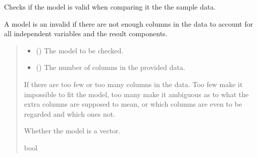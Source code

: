 \documentclass[letterpaper,10pt,english]{sphinxmanual}
\begin{document}
\begin{fulllineitems}
\label{\detokenize{ModelFitter:src.ModelFitter.check_model_is_valid_vector}}
\pysigstartsignatures
{}
\pysigstopsignatures
\sphinxAtStartPar
Checks if the model is valid when comparing it the the sample data.

\sphinxAtStartPar
A model is an invalid if there are not enough columns in the data to account for all
independent variables and the result components.
\begin{quote}\begin{description}
\begin{itemize}
\item {} 
\sphinxAtStartPar
{} ({\hyperref[\detokenize{VPCModel:src.VPCModel.VPCModel}]{}}) \textendash{} The model to be checked.

\item {} 
\sphinxAtStartPar
{} () \textendash{} The number of columns in the provided data.

\end{itemize}

\sphinxAtStartPar
{} \textendash{} If there are too few or too many columns in the data.    Too few make it impossible to fit the model, too many make it ambiguous as to what the extra    columns are supposed to mean, or which columns are even to be regarded and which ones not.

\sphinxAtStartPar
Whether the model is a vector.

\sphinxAtStartPar
bool

\end{description}\end{quote}

\end{fulllineitems}
\end{document}

